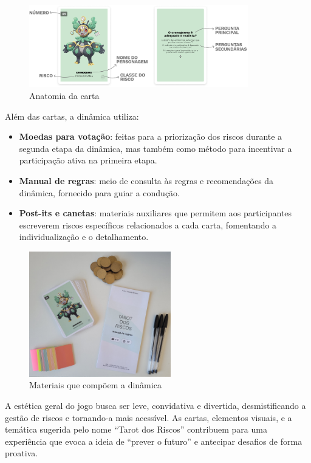 \documentclass[12pt]{article}
\begin{document}
\begin{figure}[H]
  \centering
  \caption{\label{anatomia-carta-completa} Anatomia da carta}
  \includegraphics[width=0.85\textwidth]{anatomia-carta-completa}
\end{figure}

Além das cartas, a dinâmica utiliza:

\begin{itemize}
  \item \textbf{Moedas para votação}: feitas para a priorização dos riscos durante a segunda etapa da dinâmica, mas também como método para incentivar a participação ativa na primeira etapa.
  \item \textbf{Manual de regras}: meio de consulta às regras e recomendações da dinâmica, fornecido para guiar a condução.
  \item \textbf{Post-its e canetas}: materiais auxiliares que permitem aos participantes escreverem riscos específicos relacionados a cada carta, fomentando a individualização e o detalhamento.
\end{itemize}

\begin{figure}[H]
  \centering
	\caption{\label{tarot-fisico} Materiais que compõem a dinâmica}
  \includegraphics[width=0.55\textwidth]{tarot-fisico}
\end{figure}

A estética geral do jogo busca ser leve, convidativa e divertida, desmistificando a gestão de riscos e tornando-a mais acessível. As cartas, elementos visuais, e a temática sugerida pelo nome “Tarot dos Riscos” contribuem para uma experiência que evoca a ideia de “prever o futuro” e antecipar desafios de forma proativa.
\end{document}
